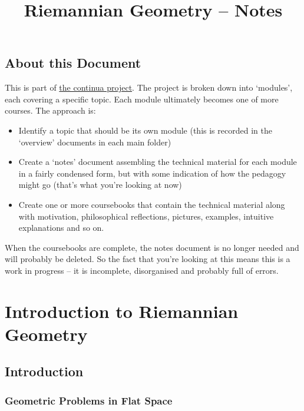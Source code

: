 \documentclass[oneside,english]{amsbook}
\numberwithin{section}{chapter}
\theoremstyle{plain}
\theoremstyle{definition}
\begin{document}
	
	\title{Riemannian Geometry -- Notes}
	
	\maketitle
	
	\tableofcontents
	
	\chapter*{About this Document}
	
	This is part of \href{https://github.com/FineArtMaths/continua}{the continua project}. The project is broken down into `modules', each covering a specific topic. Each module ultimately becomes one of more courses. The approach is:
	
	\begin{itemize}
		\item{Identify a topic that should be its own module (this is recorded in the `overview' documents in each main folder)}
		\item{Create a `notes' document assembling the technical material for each module in a fairly condensed form, but with some indication of how the pedagogy might go (that's what you're looking at now)}
		\item{Create one or more coursebooks that contain the technical material along with motivation, philosophical reflections, pictures, examples, intuitive explanations and so on.}
	\end{itemize}
	
	When the coursebooks are complete, the notes document is no longer needed and will probably be deleted. So the fact that you're looking at this means this is a work in progress -- it is incomplete, disorganised and probably full of errors.
	
	\part{Introduction to Riemannian Geometry}
	
	\chapter{Introduction}
		\section{Geometric Problems in Flat Space}
\end{document}
